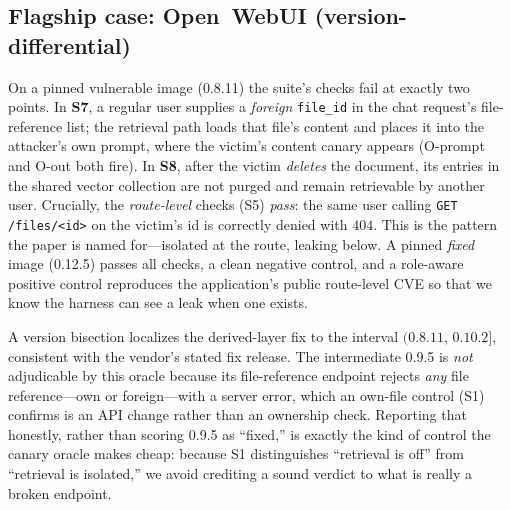 \IfFileExists{IEEEtran.cls}{\documentclass[conference]{IEEEtran}}{\documentclass[10pt,twocolumn]{article}}
\newcommand{\code}[1]{\texttt{\small #1}}
\begin{document}
\subsection{Flagship case: Open~WebUI (version-differential)}
On a pinned vulnerable image (0.8.11) the suite's checks fail at exactly two points. In \textbf{S7},
a regular user supplies a \emph{foreign} \code{file\_id} in the chat request's file-reference list;
the retrieval path loads that file's content and places it into the attacker's own prompt, where the
victim's content canary appears (O-prompt and O-out both fire). In \textbf{S8}, after the victim
\emph{deletes} the document, its entries in the shared vector collection are not purged and remain
retrievable by another user. Crucially, the \emph{route-level} checks (S5) \emph{pass}: the same user
calling \code{GET /files/<id>} on the victim's id is correctly denied with $404$. This is the
pattern the paper is named for---isolated at the route, leaking below. A pinned \emph{fixed} image
(0.12.5) passes all checks, a clean negative control, and a role-aware positive control reproduces
the application's public route-level CVE so that we know the harness can see a leak when one exists.

A version bisection localizes the derived-layer fix to the interval $(0.8.11,\,0.10.2]$, consistent
with the vendor's stated fix release. The intermediate 0.9.5 is \emph{not} adjudicable by this oracle
because its file-reference endpoint rejects \emph{any} file reference---own or foreign---with a
server error, which an own-file control (S1) confirms is an API change rather than an ownership
check. Reporting that honestly, rather than scoring 0.9.5 as ``fixed,'' is exactly the kind of
control the canary oracle makes cheap: because S1 distinguishes ``retrieval is off'' from ``retrieval
is isolated,'' we avoid crediting a sound verdict to what is really a broken endpoint.
\end{document}
